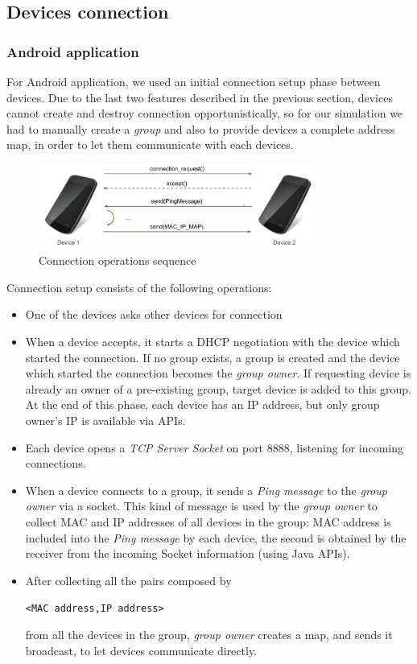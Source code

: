 \subsection{Devices connection}

\subsubsection{Android application}
For Android application, we used an initial connection setup phase between devices.
Due to the last two \direct features described in the previous section, devices cannot create and destroy connection opportunistically, so for our simulation we had to manually create a \direct \textit{group} and also to provide devices a complete address map, in order to  let them communicate with each devices.

\begin{figure}[!htbp]
\centering
\includegraphics[width=3.6in]{imgs/device_connection_ops.pdf}
\caption{Connection operations sequence}
\label{fig:device_connection}
\end{figure}

Connection setup consists of the following operations:
	\begin{itemize}
		\item One of the devices asks other devices for connection
		\item When a device accepts, it starts a DHCP negotiation with the device which started the connection. If no \direct group exists, a group is created and the device which started the connection becomes the \textit{group owner}. If requesting device is already an owner of a pre-existing group, target device is added to this group. At the end of this phase, each device has an IP address, but only group owner's IP is available via \direct APIs. 
		\item Each device opens a \textit{TCP Server Socket} on port 8888, listening for incoming connections.
		\item When a device connects to a group, it sends a \textit{Ping message} to the \textit{group owner} via a socket. This kind of message is used by the \textit{group owner} to collect MAC and IP addresses of all devices in the group: MAC address is included into the \emph{Ping message} by each device, the second is obtained by the receiver from the incoming Socket information (using Java APIs).
		\item After collecting all the pairs composed by \begin{center}\tt{<MAC address,IP address>}\end{center} from all the devices in the group, \textit{group owner} creates a map, and sends it broadcast, to let devices communicate directly.
	\end{itemize}

